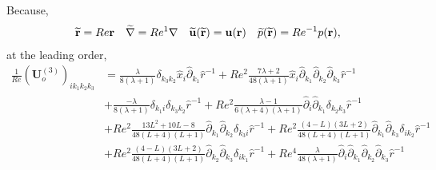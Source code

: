 Because,
\begin{align}
    \widetilde{\textbf{r}} = Re \textbf{r}
    && \widetilde{\mathbf{\nabla}} = Re^{1} \mathbf{\nabla}
    && \widetilde{\textbf{u}}(\widetilde{\textbf{r}}) = \textbf{u}(\textbf{r})
    && \widetilde{p}(\widetilde{\textbf{r}}) = Re^{-1} p(\textbf{r}),
\end{align}
at the leading order,
\begin{align*}
    \frac{1}{Re}(\textbf{U}^{(3)}_o)_{ik_1k_2k_3}
    &=
    \frac{\lambda}{8(\lambda+1)}\delta_{k_3 k_2 } \hat{x}_i\hat{\partial}_{k_1} \hat{r}^{-1}
    + Re^2 \frac{7\lambda+2}{48(\lambda +1)} \hat{x}_i \hat{\partial}_{k_1} \hat{\partial}_{k_2} \hat{\partial}_{k_3} \hat{r}^{-1} \\
    &+ \frac{-\lambda}{8(\lambda+1)}\delta_{k_1 i} \delta_{k_3 k_2} \hat{r}^{-1}
    + Re^2 \frac{\lambda-1}{6(\lambda+4)(\lambda+1)}\hat{\partial}_{i  }\hat{\partial}_{k_1}\delta_{k_2 k_3} \hat{r}^{-1}\\
    &+ Re^2 \frac{13 L^2 + 10 L - 8}{48(L + 4)(L + 1)} \hat{\partial}_{k_1}\hat{\partial}_{k_2} \delta_{k_3 i} \hat{r}^{-1}
    + Re^2 \frac{(4 - L) (3 L + 2)}{48(L + 4)(L + 1)} \hat{\partial}_{k_1}\hat{\partial}_{k_3} \delta_{i k_2}\hat{r}^{-1}\\
    &+ Re^2 \frac{(4 - L) (3 L + 2)}{48(L + 4)(L + 1)}\hat{\partial}_{k_2}\hat{\partial}_{k_3} \delta_{i k_1}\hat{r}^{-1}
    +Re^4 \frac{\lambda}{48(\lambda+1)}\hat{\partial}_{i}\hat{\partial}_{k_1}\hat{\partial}_{k_2}\hat{\partial}_{k_3}\hat{r}^{-1}
\end{align*}

